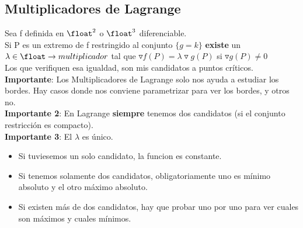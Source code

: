 \documentclass[10pt,a4paper]{article}
\begin{document}
\subsection*{Multiplicadores de Lagrange}
Sea f definida en $\float^{2}$ o $\float^{3}$ diferenciable. \\
Si P es un extremo de f restringido al conjunto $\{g = k\}$ \textbf{existe} un $\lambda \in \float \rightarrow multiplicador$ tal que $\triangledown f(P) = \lambda \triangledown g(P)$ si $\triangledown g(P) \neq 0$ \\
Los que verifiquen esa igualdad, son mis candidatos a puntos críticos.   \\
\textbf{Importante}: Los Multiplicadores de Lagrange solo nos ayuda a estudiar los bordes. Hay casos donde nos conviene parametrizar para ver los bordes, y otros no. \\
\textbf{Importante 2}: En Lagrange \textbf{siempre} tenemos dos candidatos (si el conjunto restricción es compacto). \\
\textbf{Importante 3}: El $\lambda$ es único. 
\begin{itemize}
    \item Si tuviesemos un solo candidato, la funcion es constante. 
    \item Si tenemos solamente dos candidatos, obligatoriamente uno es mínimo absoluto y el otro máximo absoluto.
    \item Si existen más de dos candidatos, hay que probar uno por uno para ver cuales son máximos y cuales mínimos.
\end{itemize}
\end{document}
